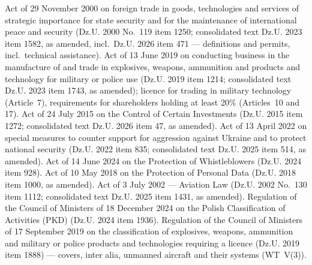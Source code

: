 \begin{BibList}
 Act of 29 November 2000 on foreign trade in goods, technologies and services of strategic importance for state security and for the maintenance of international peace and security (Dz.U. 2000 No.~119 item 1250; consolidated text Dz.U. 2023 item 1582, as amended, incl.\ Dz.U. 2026 item 471 --- definitions and permits, incl.\ technical assistance).
 Act of 13 June 2019 on conducting business in the manufacture of and trade in explosives, weapons, ammunition and products and technology for military or police use (Dz.U. 2019 item 1214; consolidated text Dz.U. 2023 item 1743, as amended); licence for trading in military technology (Article~7), requirements for shareholders holding at least 20\% (Articles~10 and 17).
 Act of 24 July 2015 on the Control of Certain Investments (Dz.U. 2015 item 1272; consolidated text Dz.U. 2026 item 47, as amended).
 Act of 13 April 2022 on special measures to counter support for aggression against Ukraine and to protect national security (Dz.U. 2022 item 835; consolidated text Dz.U. 2025 item 514, as amended).
 Act of 14 June 2024 on the Protection of Whistleblowers (Dz.U. 2024 item 928).
 Act of 10 May 2018 on the Protection of Personal Data (Dz.U. 2018 item 1000, as amended).
 Act of 3 July 2002 --- Aviation Law (Dz.U. 2002 No.~130 item 1112; consolidated text Dz.U. 2025 item 1431, as amended).
 Regulation of the Council of Ministers of 18 December 2024 on the Polish Classification of Activities (PKD) (Dz.U. 2024 item 1936).
 Regulation of the Council of Ministers of 17 September 2019 on the classification of explosives, weapons, ammunition and military or police products and technologies requiring a licence (Dz.U. 2019 item 1888) --- covers, inter alia, unmanned aircraft and their systems (WT~V(3)).
\end{BibList}


